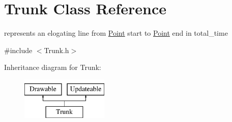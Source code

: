 \hypertarget{class_trunk}{}\section{Trunk Class Reference}
\label{class_trunk}


represents an elogating line from \mbox{\hyperlink{struct_point}{Point}} start to \mbox{\hyperlink{struct_point}{Point}} end in total\+\_\+time  




{\ttfamily \#include $<$Trunk.\+h$>$}

Inheritance diagram for Trunk\+:\begin{figure}[H]
\begin{center}
\leavevmode
\includegraphics[height=2.000000cm]{dc/dbb/class_trunk}
\end{center}
\end{figure}
